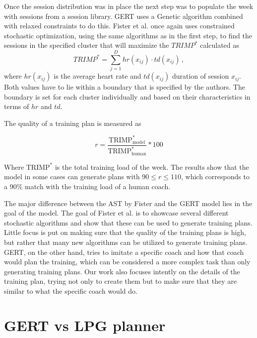 Once the session distribution was in place the next step was to populate the week with sessions from a session library.
GERT uses a Genetic algorithm combined with relaxed constraints to do this.
Fister et al. once again uses constrained stochastic optimization, using the same algorithms as in the first step, to find the sessions in the specified cluster that will maximize the $TRIMP^\ast$ calculated as
\begin{equation}
    TRIMP^\ast = \sum_{j=1}^D hr(x_{ij}) \cdot td(x_{ij})\,,
\end{equation}
where $hr(x_{ij})$ is the average heart rate and $td(x_{ij})$ duration of session $x_{ij}$.
Both values have to lie within a boundary that is specified by the authors.
The boundary is set for each cluster individually and based on their characteristics in terms of $hr$ and $td$.

The quality of a training plan is measured as

\begin{equation}
    r = \frac{\text{TRIMP}^{\ast}_{\text{model}}}{\text{TRIMP}^{\ast}_{\text{human}}} * 100
\end{equation}

Where $\text{TRIMP}^{\ast}$ is the total training load of the week.
The results show that the model in some cases can generate plans with $90 \leq r \leq 110$, which corresponds to a 90\% match with the training load of a human coach.

The major difference between the AST by Fister and the GERT model lies in the goal of the model.
The goal of Fister et al. is to showcase several different stochastic algorithms and show that these can be used to generate training plans.
Little focus is put on making sure that the quality of the training plans is high, but rather that many new algorithms can be utilized to generate training plans.
GERT, on the other hand, tries to imitate a specific coach and how that coach would plan the training, which can be considered a more complex task than only generating training plans.
Our work also focuses intently on the details of the training plan, trying not only to create them but to make sure that they are similar to what the specific coach would do.

\section{GERT vs LPG planner}

